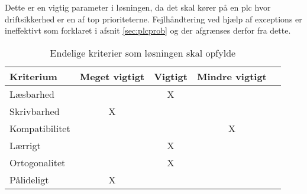 Dette er en vigtig parameter i løsningen, da det skal kører på en \gls{plc} hvor driftsikkerhed er en af top prioriteterne. Fejlhåndtering ved hjælp af exceptions er ineffektivt som forklaret i afsnit \ref{sec:plcprob} og der afgrænses derfor fra dette.

\begin{table}[H]
\centering
{}
\begin{tabular}{l c c c c}
\toprule
\textbf{Kriterium} & \textbf{Meget vigtigt} & \textbf{Vigtigt} & \textbf{Mindre vigtigt}  \\ \midrule
Læsbarhed        &   & X &       \\ 
Skrivbarhed       & X &   &       \\ 
Kompatibilitet       &   &   & X     \\ 
Lærrigt       &   & X &       \\ 
Ortogonalitet      &   & X &       \\ 
Pålideligt        & X &   &       \\ \bottomrule
\end{tabular}
\caption{Endelige kriterier som løsningen skal opfylde}
\label{table:kriterier}
\end{table}






